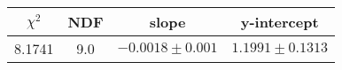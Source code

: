 \begin{tabular}{|c|c|c|c|}

\hline
$\chi^{2}$ & NDF & slope & y-intercept  \\
\hline
8.1741 & 9.0 & $-0.0018\pm0.001$ & $1.1991\pm0.1313$ \\
\hline

\end{tabular}